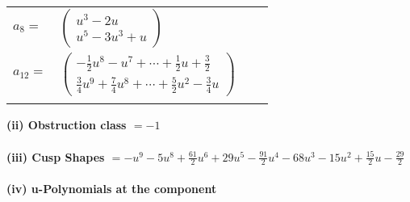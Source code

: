 \documentclass[1p]{elsarticle_modified}
\theoremstyle{definition}
\begin{document}
\begin{tabular}{m{7pt} m{180pt} m{7pt} m{180pt} }
\flushright $a_{8}=$&$\begin{pmatrix}u^3-2 u\\u^5-3 u^3+u\end{pmatrix}$ \\
\flushright $a_{12}=$&$\begin{pmatrix}-\frac{1}{2} u^8- u^7+\cdots+\frac{1}{2} u+\frac{3}{2}\\\frac{3}{4} u^9+\frac{7}{4} u^8+\cdots+\frac{5}{2} u^2-\frac{3}{4} u\end{pmatrix}$\\&\end{tabular}
\flushleft \textbf{(ii) Obstruction class $= -1$}\\~\\
\flushleft \textbf{(iii) Cusp Shapes $= - u^9-5 u^8+\frac{61}{2} u^6+29 u^5-\frac{91}{2} u^4-68 u^3-15 u^2+\frac{15}{2} u-\frac{29}{2}$}\\~\\
\newpage\renewcommand{\arraystretch}{1}
\flushleft \textbf{(iv) u-Polynomials at the component}\newline \\
\end{document}
